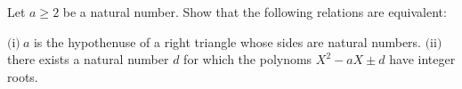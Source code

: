 Let $ a\ge 2 $ be a natural number. Show that the following relations are equivalent:

$ \text{(i)} \ a $ is the hypothenuse of a right triangle whose sides are natural numbers.
$ \text{(ii)}\quad $ there exists a natural number $ d $ for which the polynoms $ X^2-aX\pm d $ have integer roots.